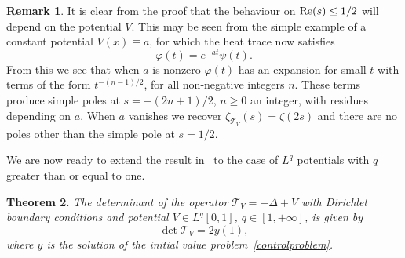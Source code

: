\documentclass[10pt,a4paper]{amsart}
\theoremstyle{plain}
\newtheorem{theorem}{Theorem}
\theoremstyle{definition}
\newtheorem{remark}[theorem]{Remark}
\newcommand{\ttt}{\mathscr{T}}
\let\balpha q
\begin{document}
\begin{remark}
It is clear from the proof that the behaviour on $\re(s)\leq 1/2$ will depend on the potential $V$. This may be seen from the simple example of a constant
potential $V(x) \equiv a$, for which the heat trace now satisfies
\[
\varphi(t) = e^{-a t}\psi(t).
\]
From this we see that when $a$ is nonzero $\varphi(t)$ has an expansion for small $t$ with terms of the form $t^{-(n-1)/2}$, for all non-negative
integers $n$. These terms produce simple poles at $s=-(2n+1)/2$, $n\geq 0$ an integer, with residues depending on $a$. When $a$ vanishes
we recover $\zeta_{\ttt_V}(s) = \zeta(2s)$ and there are no poles other than the simple pole at $s=1/2$.
\end{remark}

We are now ready to extend the result in~\cite{Levit-Smilansky} to the case of
$L^{\balpha}$ potentials with $\balpha$ greater than or equal to one.
\begin{theorem} \label{thm0}
The determinant of the operator $\ttt_V =-\Delta + V$ with Dirichlet boundary
conditions and potential $V\in L^\balpha[0,1]$, $\balpha \in[1,+\infty]$,
is given by
\begin{equation}\label{eq:dety1}
\det\ttt_V = 2y(1),
\end{equation}
where $y$ is the solution of the initial value problem~\eqref{controlproblem}.
\end{theorem}
\end{document}
